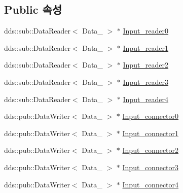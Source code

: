 \subsection*{Public 속성}
\begin{DoxyCompactItemize}
\item 
dds\+::sub\+::\+Data\+Reader$<$ Data\+\_ $>$ $\ast$ \hyperlink{classInputDataPort__Fac_ad4336e1795b30d34b8fc78209405173c}{Input\+\_\+reader0}
\item 
dds\+::sub\+::\+Data\+Reader$<$ Data\+\_ $>$ $\ast$ \hyperlink{classInputDataPort__Fac_a792017ee994f74bb649bd673ab7fb02a}{Input\+\_\+reader1}
\item 
dds\+::sub\+::\+Data\+Reader$<$ Data\+\_ $>$ $\ast$ \hyperlink{classInputDataPort__Fac_a4a0fff757eea71f4c9d28909442d71ac}{Input\+\_\+reader2}
\item 
dds\+::sub\+::\+Data\+Reader$<$ Data\+\_ $>$ $\ast$ \hyperlink{classInputDataPort__Fac_ac3626a23fa27c43e0a63aa68f022fc2d}{Input\+\_\+reader3}
\item 
dds\+::sub\+::\+Data\+Reader$<$ Data\+\_ $>$ $\ast$ \hyperlink{classInputDataPort__Fac_adfaed3a3a4363088fb1df54b1fb5d6b1}{Input\+\_\+reader4}
\item 
dds\+::pub\+::\+Data\+Writer$<$ Data\+\_ $>$ $\ast$ \hyperlink{classInputDataPort__Fac_af0886b8147a82738272b964c85d0ca28}{Input\+\_\+connector0}
\item 
dds\+::pub\+::\+Data\+Writer$<$ Data\+\_ $>$ $\ast$ \hyperlink{classInputDataPort__Fac_a8f623a6232415353dbbc2243a3c6f148}{Input\+\_\+connector1}
\item 
dds\+::pub\+::\+Data\+Writer$<$ Data\+\_ $>$ $\ast$ \hyperlink{classInputDataPort__Fac_a0f6ab746eaa0b690462afbf40116a4c1}{Input\+\_\+connector2}
\item 
dds\+::pub\+::\+Data\+Writer$<$ Data\+\_ $>$ $\ast$ \hyperlink{classInputDataPort__Fac_a8d08f056c60a03f2218652df61a644e3}{Input\+\_\+connector3}
\item 
dds\+::pub\+::\+Data\+Writer$<$ Data\+\_ $>$ $\ast$ \hyperlink{classInputDataPort__Fac_a67ee8b26e5d0195ddb518e1bc704112b}{Input\+\_\+connector4}
\end{DoxyCompactItemize}

